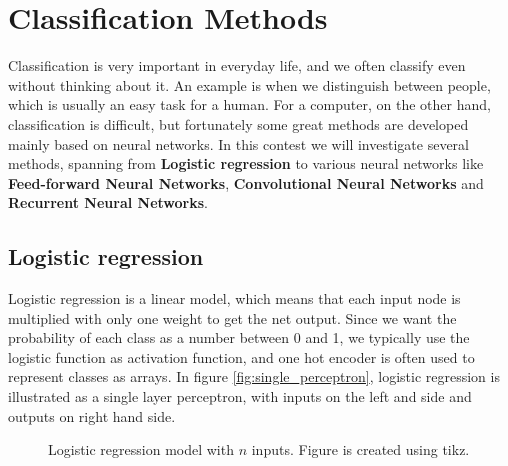 \section{Classification Methods} \label{sec:methods}
Classification is very important in everyday life, and we often classify even without thinking about it. An example is when we distinguish between people, which is usually an easy task for a human. For a computer, on the other hand, classification is difficult, but fortunately some great methods are developed mainly based on neural networks. In this contest we will investigate several methods, spanning from \textbf{Logistic regression} to various neural networks like \textbf{Feed-forward Neural Networks}, \textbf{Convolutional Neural Networks} and \textbf{Recurrent Neural Networks}. 

\subsection{Logistic regression}
Logistic regression is a linear model, which means that each input node is multiplied with only one weight to get the net output. Since we want the probability of each class as a number between 0 and 1, we typically use the logistic function as activation function, and one hot encoder is often used to represent classes as arrays. In figure \eqref{fig:single_perceptron}, logistic regression is illustrated as a single layer perceptron, with inputs on the left and side and outputs on right hand side. 

\begin{figure} [H]
	\centering
	\caption{Logistic regression model with $n$ inputs. Figure is created using tikz. \cite{tikz}}
	\label{fig:single_perceptron}
\end{figure}

